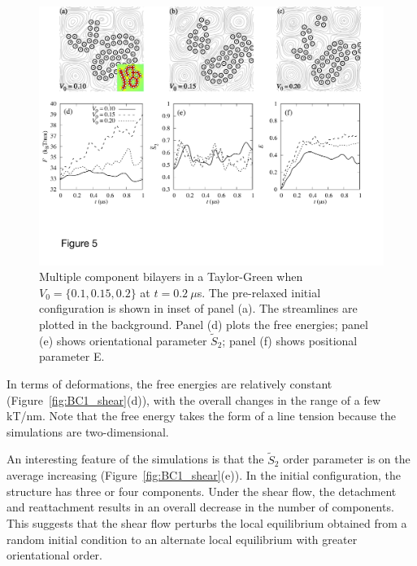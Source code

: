 \documentclass[prb,preprint,showpacs,preprintnumbers,amsmath,amssymb,longbibliography]{revtex4-1}
\begin{document}
\begin{figure}
  \begin{center}
    \includegraphics[width=1.0\textwidth]{Figures/Figure5.pdf}    
  \end{center}
  \vspace{-20pt}  
  \caption{\label{fig:BC1_TG} Multiple component bilayers in a Taylor-Green when $V_0 = \{0.1, 0.15, 0.2\}$ at $t=0.2\ \mu$s. The pre-relaxed initial configuration is shown in inset of panel (a). 
 The streamlines are plotted in the background. 
Panel (d) plots the free energies; panel (e) shows orientational parameter $\tilde{S}_2$; panel (f) shows positional parameter E.
  }
\end{figure}

In terms of deformations, 
the free energies 
are relatively constant (Figure~\ref{fig:BC1_shear}(d)),
with the overall changes in the range of a few kT/nm.  Note that the free energy takes
the form of a line tension because the simulations are two-dimensional.

An interesting feature of the simulations is that the $\tilde S_2$ order parameter
is on the average increasing (Figure~\ref{fig:BC1_shear}(e)).  In the initial configuration,
the structure has three or four components.  Under the shear flow, the detachment and reattachment
results in an overall decrease in the number of components.  This suggests that
the shear flow perturbs the local equilibrium obtained from a random initial condition
to an alternate local equilibrium with greater orientational order.   
\end{document}
